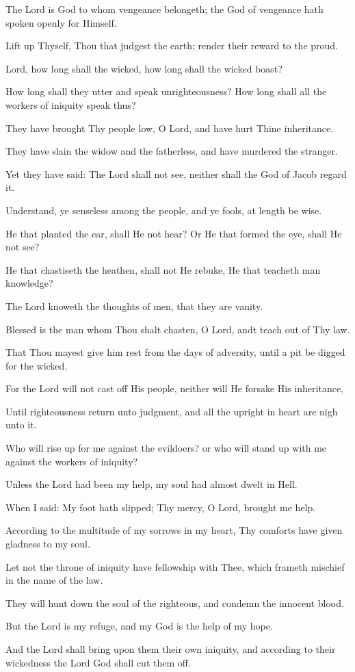 The Lord is God to whom vengeance belongeth; the God of vengeance hath spoken openly for Himself.

Lift up Thyself, Thou that judgest the earth; render their reward to the proud.

Lord, how long shall the wicked, how long shall the wicked boast?

How long shall they utter and speak unrighteousness? How long shall all the workers of iniquity speak thus?

They have brought Thy people low, O Lord, and have hurt Thine inheritance.

They have slain the widow and the fatherless, and have murdered the stranger.

Yet they have said: The Lord shall not see, neither shall the God of Jacob regard it.

Understand, ye senseless among the people, and ye fools, at length be wise.

He that planted the ear, shall He not hear? Or He that formed the eye, shall He not see?

He that chastiseth the heathen, shall not He rebuke, He that teacheth man knowledge?

The Lord knoweth the thoughts of men, that they are vanity.

Blessed is the man whom Thou shalt chasten, O Lord, andt teach out of Thy law.

That Thou mayest give him rest from the days of adversity, until a pit be digged for the wicked.

For the Lord will not cast off His people, neither will He forsake His inheritance,

Until righteousness return unto judgment, and all the upright in heart are nigh unto it.

Who will rise up for me against the evildoers? or who will stand up with me against the workers of iniquity?

Unless the Lord had been my help, my soul had almost dwelt in Hell.

When I said: My foot hath slipped; Thy mercy, O Lord, brought me help.

According to the multitude of my sorrows in my heart, Thy comforts have given gladness to my soul.

Let not the throne of iniquity have fellowship with Thee, which frameth mischief in the name of the law.

They will hunt down the soul of the righteous, and condemn the innocent blood.

But the Lord is my refuge, and my God is the help of my hope.

And the Lord shall bring upon them their own iniquity, and according to their wickedness the Lord God shall cut them off.
